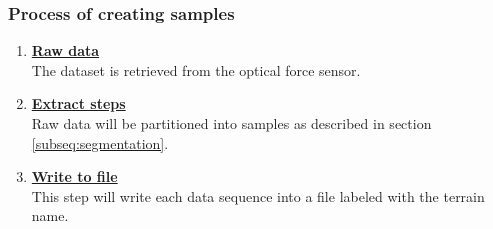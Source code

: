 \documentclass[USenglish]{ifimaster}  %
\begin{document}
\subsubsection{Process of creating samples} \label{sub:createsamples}
	\begin{enumerate}
		\item \textbf{\underline{Raw data}}
		\\
		The dataset is retrieved from the optical force sensor.
		
		\item \textbf{\underline{Extract steps}}
		\\
		Raw data will be partitioned into samples as described in section \ref{subseq:segmentation}.
		
		\item \textbf{\underline{Write to file}}
		\\
		This step will write each data sequence into a file labeled with the terrain name.
		
		
\end{enumerate}
\clearpage
\end{document}
